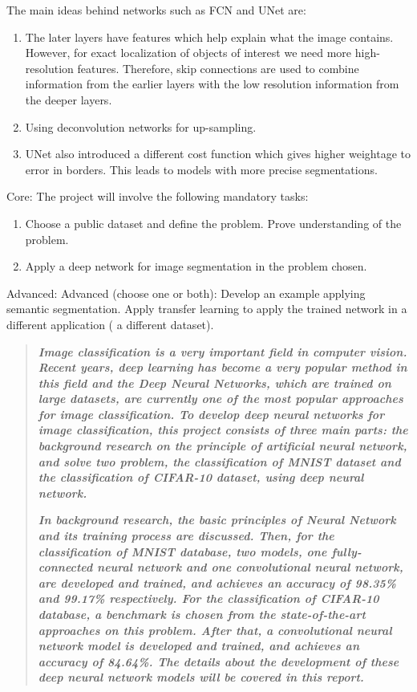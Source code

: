 \documentclass[]{UCD_CS_FYP_Report}
\begin{document}
The main ideas behind networks such as FCN and UNet are:
\begin{enumerate}
\item {The later layers have features which help explain what the image contains. However, for exact localization of objects of interest we need more high-resolution features. Therefore, skip connections are used to combine information from the earlier layers with the low resolution information from the deeper layers.} 
\item {Using deconvolution networks for up-sampling.}
\item {UNet also introduced a different cost function which gives higher weightage to error in borders. This leads to models with more precise segmentations.}
\end{enumerate}
Core: 
The project will involve the following mandatory tasks:
\begin{enumerate}
\item {Choose a public dataset and define the problem. Prove understanding of the problem.}
\item {Apply a deep network for image segmentation in the problem chosen.}
\end{enumerate}
Advanced: 
Advanced (choose one or both):
Develop an example applying semantic segmentation.
Apply transfer learning to apply the trained network in a different application ( a different dataset).


\begin{abstract}

\textbf{\textsl{Image classification is a very important field in computer vision. Recent years, deep learning has become a very popular method in this field and the Deep Neural Networks, which are trained on large datasets, are currently one of the most popular approaches for image classification. To develop deep neural networks for image classification, this project consists of three main parts: the background research on the principle of artificial neural network, and solve two problem, the classification of MNIST dataset and the classification of CIFAR-10 dataset, using deep neural network.}}

\textbf{\textsl{In background research, the basic principles of Neural Network and its training process are discussed. Then, for the classification of MNIST database, two models, one fully-connected neural network and one convolutional neural network, are developed and trained, and achieves an accuracy of 98.35\% and 99.17\% respectively. For the classification of CIFAR-10 database, a benchmark is chosen from the state-of-the-art approaches on this problem. After that, a convolutional neural network model is developed and trained, and achieves an accuracy of 84.64\%. The details about the development of these deep neural network models will be covered in this report.}}
\end{abstract}
\newpage
\end{document}
